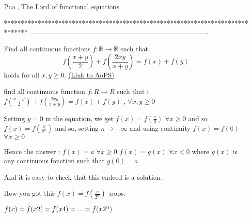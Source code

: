 \begin{solution}
	\begin{italicized}Pco , The Lord of functional equations   \end{italicized}
\end{solution}
*******************************************************************************
-------------------------------------------------------------------------------

\begin{problem}
	Find all continuous functions $f: \mathbb R \to \mathbb R$ such that \[ f\left(\frac {x + y}{2}\right) + f\left( \frac {2xy}{x + y}\right) = f(x) + f(y)\]
holds for all $ x,y \ge 0$.
	\flushright \href{https://artofproblemsolving.com/community/c6h299576}{(Link to AoPS)}
\end{problem}



\begin{solution}
	\begin{tcolorbox}find all continuous function $ f: R\to R$ such that : $ f(\frac {x + y}{2}) + f( \frac {2xy}{x + y}) = f(x) + f(y)$ , $ \forall x,y \ge 0$\end{tcolorbox}

Setting $ y=0$ in the equation, we get $ f(x)=f(\frac x2)$ $ \forall x\geq 0$ and so $ f(x)=f(\frac x{2^n})$ and so, setting $ n\to +\infty$ and using continuity $ f(x)=f(0)$ $ \forall x\geq 0$

Hence the answer :
$ f(x)=a$ $ \forall x\geq 0$
$ f(x)=g(x)$ $ \forall x<0$ where $ g(x)$ is any continuous fonction such that $ g(0)=a$

And it is easy to check that this endeed is a solution.
\end{solution}



\begin{solution}
	How you got this  $ f(x)=f\left(\frac{x}{2^n}\right)$   :oops:
\end{solution}



\begin{solution}
	$ f(x)=f(x\/2)=f(x\/4)=...=f(x\/2^n)$
\end{solution}



